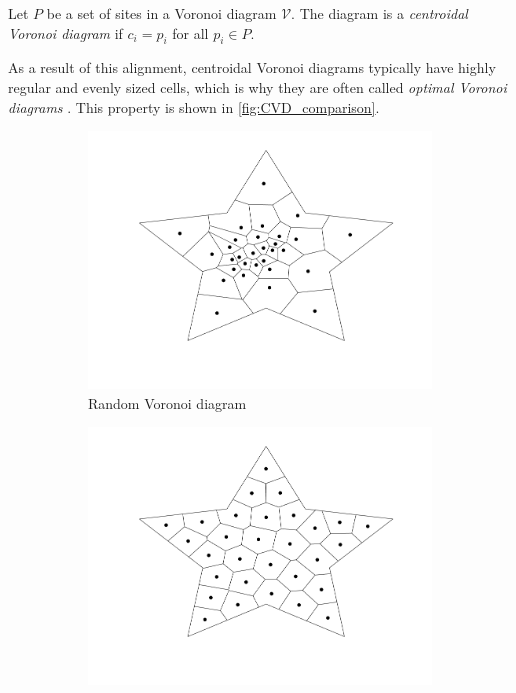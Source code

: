 \begin{definition}
Let $P$ be a set of sites in a Voronoi diagram $\mathcal{V}$. The diagram is a \emph{centroidal Voronoi diagram} if $c_i = p_i$ for all $p_i \in P$.
\end{definition}

As a result of this alignment, centroidal Voronoi diagrams typically have highly regular and evenly sized cells, which is why they are often called \emph{optimal Voronoi diagrams} \cite{UPR_thesis}. This property is shown in \autoref{fig:CVD_comparison}.

\begin{figure}[ht]
    \centering
    \begin{subfigure}[b]{0.4\textwidth}
        \centering
        \includegraphics[width=\textwidth]{report/Images/Theory/voronoi/centroidal_voronoi_diagram_0.png}
        \caption{Random Voronoi diagram}
        \label{fig:notCVD}
    \end{subfigure}
    \begin{subfigure}[b]{0.4\textwidth}
        \centering
        \includegraphics[width=\textwidth]{report/Images/Theory/voronoi/centroidal_voronoi_diagram.png}

\end{subfigure}
\end{figure}
